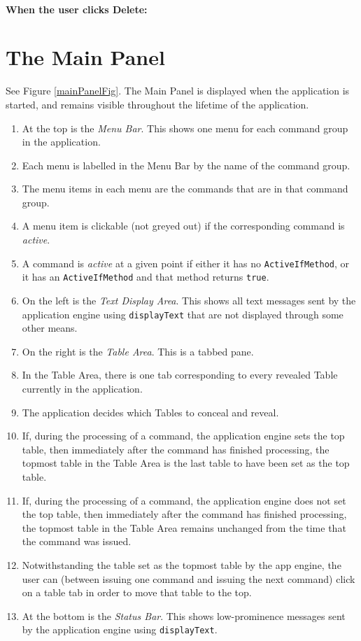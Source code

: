 \documentclass[11pt]{article}
\begin{document}
\paragraph{When the user clicks Delete:}

\section{The Main Panel}

See Figure \ref{mainPanelFig}.  The Main Panel is displayed when the
application is started, and remains visible throughout the lifetime of the
application.
\begin{enumerate}
\item At the top is the {\it Menu Bar}.  This shows one menu
  for each command group in the application.
\item Each menu is labelled in the Menu Bar by the name of the
  command group.
\item The menu items in each menu are the commands that are in
  that command group.
\item A menu item is clickable (not greyed out) if the corresponding
  command is {\it active}.
\item A command is {\it active} at a given point if either it has no
  {\tt ActiveIfMethod}, or it has an {\tt ActiveIfMethod} and that
  method returns {\tt true}.
\item On the left is the {\it Text Display Area}.  This shows all
  text messages sent by the application engine using {\tt displayText}
  that are not displayed through some other means.
\item On the right is the {\it Table Area}.  This is a tabbed pane.
\item In the Table Area, there is one tab corresponding to every
  revealed Table currently in the application.
\item The application decides which Tables to conceal and reveal.
\item If, during the processing of a command, the application engine sets
  the top table, then immediately after the command has finished
  processing, the topmost table in the Table Area is the last table to
  have been set as the top table.
\item If, during the processing of a command, the application engine
  does not set the top table, then immediately
  after the command has finished processing, the topmost table in the
  Table Area remains unchanged from the time that the command was issued.
\item Notwithstanding the table set as the topmost table by the app
  engine, the user can (between issuing one command and issuing the
  next command) click on a table tab in order to move that table to
  the top.
\item At the bottom is the {\it Status Bar}.  This shows low-prominence
  messages sent by the application engine using {\tt displayText}.
\end{enumerate}
\end{document}
